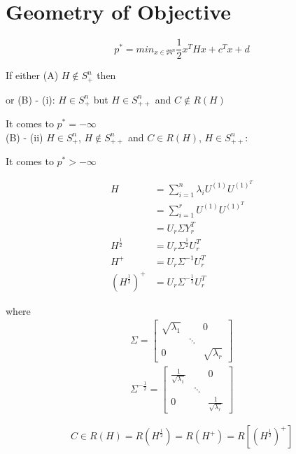 




\section{Geometry of Objective}

\begin{equation*}
p^* = min_{x\in \Re^n}\frac{1}{2}x^THx + c^Tx + d
\end{equation*}

If either (A) $H \notin S^n_+$ then

or (B) - (i): $H\in S^n_+$ but $H\in S^n_{++}$ and $C\notin R(H)$

It comes to $p^* = -\infty$\\

(B) - (ii) $H\in S^n_{+}$, $H\notin S^n_{++}$ and $C\in R(H)$, $H\in S^n_{++}$:

It comes to $p^* > -\infty$

\begin{align*}
H &= \sum^n_{i=1}\lambda_iU^{(1)}U^{(1)^T} \\
&= \sum^r_{i=1}U^{(1)}U^{(1)^T}\\
&= U_r\Sigma Y_r^T\\
H^{\frac{1}{2}} &= U_r\Sigma^{\frac{1}{2}}U_r^T\\
H^{+} &= U_r\Sigma^{-1}U_r^T\\
(H^{\frac{1}{2}})^+ &= U_r\Sigma^{-\frac{1}{2}}U_r^T
\end{align*}

where 
\begin{align*}\Sigma = 
\begin{bmatrix}
\sqrt{\lambda_1} &  & 0 \\
&\ddots&\\
0&&\sqrt{\lambda_r}
\end{bmatrix}\\\Sigma^{-\frac{1}{2}} =
\begin{bmatrix}
\frac{1}{\sqrt{\lambda_1}} &  & 0 \\
&\ddots&\\
0&&\frac{1}{\sqrt{\lambda_r}}
\end{bmatrix}
\end{align*}

\begin{equation*}
C\in R(H) = R(H^{\frac{1}{2}}) = R(H^+) = R[(H^{\frac{1}{2}})^+]
\end{equation*}


